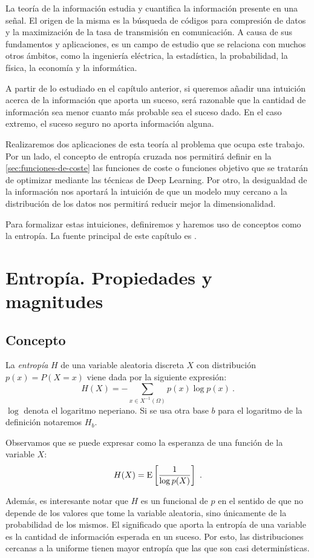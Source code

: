 La teoría de la información estudia y cuantifica la información presente
en una señal. El origen de la misma es la búsqueda de códigos para
compresión de datos y la maximización de la tasa de transmisión en
comunicación. A causa de sus fundamentos y aplicaciones, es un campo de
estudio que se relaciona con muchos otros ámbitos, como la ingeniería
eléctrica, la estadística, la probabilidad, la física, la economía y la
informática.

A partir de lo estudiado en el capítulo anterior, si queremos añadir una
intuición acerca de la información que aporta un suceso, será razonable
que la cantidad de información sea menor cuanto más probable sea el
suceso dado. En el caso extremo, el suceso seguro no aporta información
alguna.

Realizaremos dos aplicaciones de esta teoría al problema que ocupa este trabajo. Por un lado, el concepto de entropía cruzada nos permitirá definir en la \autoref{sec:funciones-de-coste} las funciones de coste o funciones objetivo que se tratarán de optimizar mediante las técnicas de Deep Learning. Por otro, la desigualdad de la información nos aportará la intuición de que un modelo muy cercano a la distribución de los datos nos permitirá reducir mejor la dimensionalidad.

Para formalizar estas intuiciones, definiremos y haremos uso de
conceptos como la entropía. La fuente principal de este capítulo es
\textcite{coverit}.

\section{Entropía. Propiedades y
magnitudes}\label{entropuxeda.-propiedades-y-magnitudes}

\subsection{Concepto}\label{concepto}

La \emph{entropía} \(H\) de una variable aleatoria discreta \(X\) con
distribución \(p(x)=P(X=x)\) viene dada por la siguiente expresión:
\[H(X)=-\sum_{x\in X^{-1}(\Omega)}p(x)\log p(x)~.\] $\log$ denota el logaritmo neperiano. Si se usa otra base
\(b\) para el logaritmo de la definición notaremos \(H_{b}\). 

Observamos que se puede expresar como la esperanza de una función de la
variable \(X\): \[H(X)=\mathrm{E}\left[\frac 1 {\log p(X)}\right]~.\]

Además, es interesante notar que \(H\) es un funcional de \(p\) en el
sentido de que no depende de los valores que tome la variable aleatoria,
sino únicamente de la probabilidad de los mismos. El significado que
aporta la entropía de una variable es la cantidad de información
esperada en un suceso. Por esto, las distribuciones cercanas a la
uniforme tienen mayor entropía que las que son casi determinísticas.

